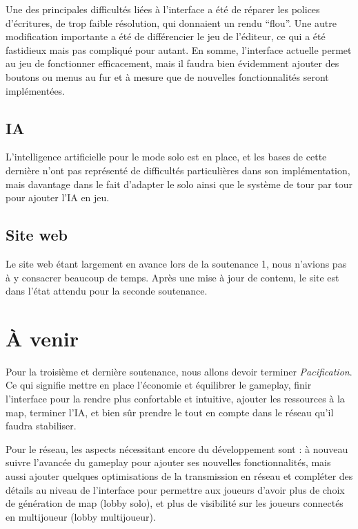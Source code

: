 \documentclass[12pt]{report}
\begin{document}
Une des principales difficultés liées à l’interface a été de réparer les
polices d’écritures, de trop faible résolution, qui donnaient un rendu “flou”.
Une autre modification importante a été de différencier le jeu de l’éditeur, ce
qui a été fastidieux mais pas compliqué pour autant. En somme, l’interface
actuelle permet au jeu de fonctionner efficacement, mais il faudra bien
évidemment ajouter des boutons ou menus au fur et à mesure que de nouvelles
fonctionnalités seront implémentées.

\section*{IA}

L'intelligence artificielle pour le mode solo est en place, et les bases de
cette dernière n'ont pas représenté de difficultés particulières dans son
implémentation, mais davantage dans le fait d'adapter le solo ainsi que le
système de tour par tour pour ajouter l'IA en jeu.

\section*{Site web}

Le site web étant largement en avance lors de la soutenance 1, nous n’avions pas
à y consacrer beaucoup de temps. Après une mise à jour de contenu, le site est
dans l’état attendu pour la seconde soutenance.

\chapter{À venir}

Pour la troisième et dernière soutenance, nous allons devoir terminer
\textit{Pacification}. Ce qui signifie mettre en place l'économie et équilibrer
le gameplay, finir l'interface pour la rendre plus confortable et intuitive,
ajouter les ressources à la map, terminer l'IA, et bien sûr prendre le tout en
compte dans le réseau qu'il faudra stabiliser.

Pour le réseau, les aspects nécessitant encore du développement sont : à nouveau
suivre l’avancée du gameplay pour ajouter ses nouvelles fonctionnalités, mais
aussi ajouter quelques optimisations de la transmission en réseau et compléter
des détails au niveau de l’interface pour permettre aux joueurs d’avoir plus de
choix de génération de map (lobby solo), et plus de visibilité sur les joueurs
connectés en multijoueur (lobby multijoueur).
\end{document}

